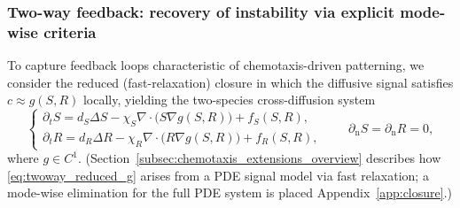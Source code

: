 \documentclass[pdflatex,sn-mathphys-ay]{sn-jnl}
\theoremstyle{thmstyleone}
\theoremstyle{definition}
\theoremstyle{remark}
\begin{document}
\subsubsection{Two-way feedback: recovery of instability via explicit mode-wise criteria}
\label{subsubsec:main_twoway}

To capture feedback loops characteristic of chemotaxis-driven patterning, we consider the reduced (fast-relaxation) closure
in which the diffusive signal satisfies $c\approx g(S,R)$ locally, yielding the two-species cross-diffusion system
\begin{equation}
\label{eq:twoway_reduced_g}
\begin{cases}
\partial_t S = d_S\Delta S - \chi_S\nabla\cdot\bigl(S\nabla g(S,R)\bigr) + f_S(S,R),\\[3pt]
\partial_t R = d_R\Delta R - \chi_R\nabla\cdot\bigl(R\nabla g(S,R)\bigr) + f_R(S,R),
\end{cases}
\qquad \partial_{\mathrm n}S=\partial_{\mathrm n}R=0,
\end{equation}
where $g\in C^1$.
(Section~\ref{subsec:chemotaxis_extensions_overview} describes how \eqref{eq:twoway_reduced_g} arises from a PDE signal model
via fast relaxation; a mode-wise elimination for the full PDE system is placed Appendix~\ref{app:closure}.)
\end{document}
